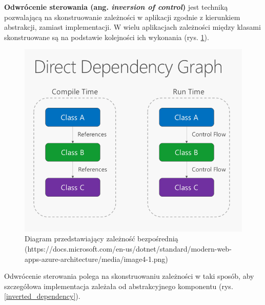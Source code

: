 \textbf{Odwrócenie sterowania (ang. \textit{inversion of control})} jest techniką pozwalającą na skonstruowanie zależności w aplikacji zgodnie z kierunkiem abstrakcji, zamiast implementacji. W wielu aplikacjach zależności między klasami skonstruowane są na podstawie kolejności ich wykonania (rys. \ref{direct_dependency}).
\begin{figure}[!ht]
	\begin{center}
		\includegraphics[width=6in]{img/diagram/direct_dependency.png}
		\caption{Diagram przedstawiający zależność bezpośrednią (https://docs.microsoft.com/en-us/dotnet/standard/modern-web-apps-azure-architecture/media/image4-1.png)}
		\label{direct_dependency}
	\end{center}
\end{figure}
Odwrócenie sterowania polega na skonstruowaniu zależności w taki sposób, aby szczegółowa implementacja zależała od abstrakcyjnego komponentu (rys. \ref{inverted_dependency}).\cite{inversionofcontrol}

